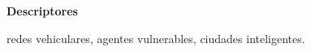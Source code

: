 \vspace{2em}

{\Large\bfseries\sectionfont Descriptores}
\vspace{3\medskipamount}

redes vehiculares, agentes vulnerables, ciudades inteligentes.

\cleardoublepage\tableofcontents
\cleardoublepage\listoffigures
\cleardoublepage\listoftables
\cleardoublepage\listoflistings

\mainmatter
\pagestyle{phdthesis}